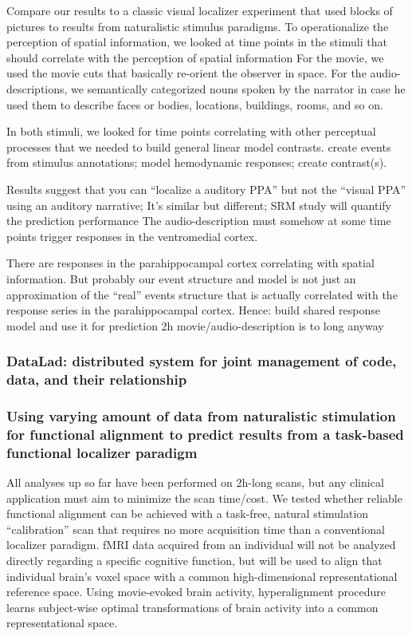 Compare our results to a classic visual localizer experiment that used blocks of
pictures to results from naturalistic stimulus paradigms.
%
To operationalize the perception of spatial information, we looked at time
points in the stimuli that should correlate with the perception of spatial
information
%
For the movie, we used the movie cuts that basically re-orient the observer in
space.
%
For the audio-descriptions, we semantically categorized nouns spoken by the
narrator in case he used them to describe faces or bodies, locations, buildings,
rooms, and so on.

%
In both stimuli, we looked for time points correlating with other perceptual
processes that we needed to build general linear model contrasts.
%
create events from stimulus annotations;
%
model hemodynamic responses;
%
create contrast(s).

%
Results suggest that you can ``localize a auditory PPA'' but not the ``visual
PPA'' using an auditory narrative; It's similar but different; SRM study will
quantify the prediction performance
%
The audio-description must somehow at some time points trigger responses in the
ventromedial cortex.

%
There are responses in the parahippocampal cortex correlating with
spatial information.
%
But probably our event structure and model is not just an approximation of the
``real'' events structure that is actually correlated with the response series
in the parahippocampal cortex.
%
Hence: build shared response model and use it for prediction
%
2h movie/audio-description is to long anyway


\subsubsection{DataLad: distributed system for joint management of code, data,
and their relationship}



\subsubsection{Using varying amount of data from naturalistic stimulation for
functional alignment to predict results from a task-based functional localizer
paradigm}


%
All analyses up so far have been performed on 2h-long scans, but any
clinical application must aim to minimize the scan time/cost.
%
We tested whether reliable functional alignment can be achieved with a task-free,
natural stimulation ``calibration'' scan that requires no more acquisition time
than a conventional localizer paradigm.
%
fMRI data acquired from an individual will not be analyzed directly regarding a
specific cognitive function, but will be used to align that individual brain's
voxel space with a common high-dimensional representational reference space.
%
Using movie-evoked brain activity, hyperalignment procedure learns subject-wise
optimal transformations of brain activity into a common representational space.

